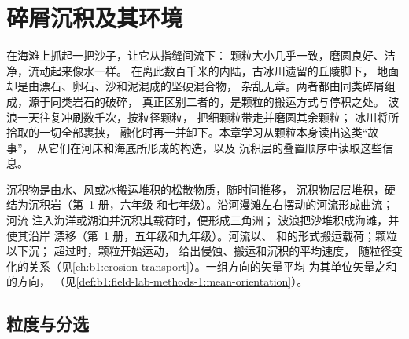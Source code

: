 \chapter{碎屑沉积及其环境}\label{ch:b1:clastic-sediments}

在海滩上抓起一把沙子，让它从指缝间流下：
颗粒大小几乎一致，磨圆良好、洁净，流动起来像水一样。
在离此数百千米的内陆，古冰川遗留的丘陵脚下，
地面却是由漂石、卵石、沙和泥混成的坚硬混合物，
杂乱无章。两者都由同类碎屑组成，源于同类岩石的破碎，
真正区别二者的，是颗粒的搬运方式与停积之处。
波浪一天往复冲刷数千次，按粒径颗粒，
把细颗粒带走并磨圆其余颗粒；
冰川将所拾取的一切全部裹挟，
融化时再一并卸下。本章学习从颗粒本身读出这类“故事”，
从它们在河床和海底所形成的构造，以及
沉积层的叠置顺序中读取这些信息。

\begin{recall}
沉积物是由水、风或冰搬运堆积的松散物质，随时间推移，
沉积物层层堆积，硬结为沉积岩（第~1 册，六年级
和七年级）。沿河漫滩左右摆动的河流形成曲流；河流
注入海洋或湖泊并沉积其载荷时，便形成三角洲；
波浪把沙堆积成海滩，并使其沿岸
漂移（第~1 册，五年级和九年级）。河流以、
和的形式搬运载荷；颗粒以下沉；
超过时，颗粒开始运动，
给出侵蚀、搬运和沉积的平均速度，
随粒径变化的关系（见\cref{ch:b1:erosion-transport}）。一组方向的矢量平均
为其单位矢量之和的方向，
（见\cref{def:b1:field-lab-methods-1:mean-orientation}）。
\end{recall}

\section{粒度与分选}\label{sec:b1:clastic-sediments:grain-size}

